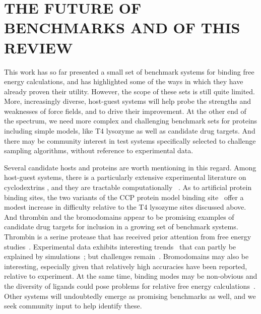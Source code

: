 \documentclass[aps,pre,twocolumn,nofootinbib,superscriptaddress,10pt, final,tightenlines]{revtex4-1}
\begin{document}

\section{THE FUTURE OF BENCHMARKS AND OF THIS REVIEW}
\label{sec:updates}
This work has so far presented a small set of benchmark systems for binding free energy calculations, and has highlighted some of the ways in which they have already proven their utility. 
However, the scope of these sets is still quite limited. 
More, increasingly diverse, host-guest systems will help probe the strengths and weaknesses of force fields, and to drive their improvement. 
At the other end of the spectrum, we need more complex and challenging benchmark sets for proteins including simple models, like T4 lysozyme as well as candidate drug targets. 
And there may be community interest in test systems specifically selected to challenge sampling algorithms, without reference to experimental data.

Several candidate hosts and proteins are worth mentioning in this regard. 
Among host-guest systems, there is a particularly extensive experimental literature on cyclodextrins \cite{godinez_thermodynamic_1997, rekharsky_complexation_1998}, and they are tractable computationally ~\cite{henriksen_computational_2015, wickstrom_parameterization_2016}. 
As to artificial protein binding sites, the two variants of the CCP protein model binding site~\cite{fitzgerald_ligand-gated_1996, banba_free_2000, banba_efficient_2000, rocklin_blind_2013, musah_artificial_2002, rosenfeld_excision_2002} offer a modest increase in difficulty relative to the T4 lysozyme sites discussed above. 
And thrombin and the bromodomains appear to be promising examples of candidate drug targets for inclusion in a growing set of benchmark systems. 
Thrombin is a serine protease that has received prior attention from free energy studies~\cite{wang_achieving_2012, schrodinger_accurate_2015, calabro_elucidation_2016}. 
Experimental data exhibits interesting trends~\cite{baum_non-additivity_2010} that can partly be explained by simulations~\cite{calabro_elucidation_2016}; but challenges remain~\cite{calabro_accelerating_2015}.
Bromodomains may also be interesting, especially given that relatively high accuracies have been reported, relative to experiment. 
At the same time, binding modes may be non-obvious and the diversity of ligands could pose problems for relative free energy calculations~\cite{aldeghi_accurate_2016}.
Other systems will undoubtedly emerge as promising benchmarks as well, and we seek community input to help identify these.
\end{document}
